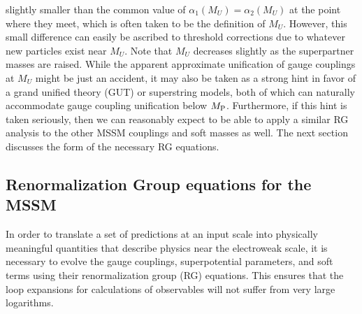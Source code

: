 \documentclass[12pt]{article}
\def\MPlanck{M_{\rm P}}
\begin{document}
slightly smaller than the common value of $\alpha_1(M_U) = \alpha_2(M_U)$
at the point where they meet, which is often taken to be the definition 
of $M_U$. However, this small difference can easily be ascribed to 
threshold corrections due to whatever new particles exist near $M_U$.
Note that $M_U$ decreases slightly as the superpartner masses are 
raised. While 
the apparent approximate unification of gauge couplings at $M_U$ might be 
just an 
accident, it may also be taken as a strong hint in favor of a grand 
unified theory (GUT) or superstring models, both of which can naturally 
accommodate gauge coupling unification below $\MPlanck$. Furthermore, if 
this hint is taken seriously, then we can reasonably expect to be able to 
apply a similar RG analysis to the other MSSM couplings and soft masses as 
well. The next section discusses the form of the necessary RG equations.

\subsection{Renormalization Group equations for the MSSM\label{subsec:RGEs}}
\setcounter{footnote}{1}
\setcounter{equation}{0}

In order to translate a set of predictions at an input scale into 
physically meaningful quantities that describe physics near the 
electroweak scale, it is necessary to evolve the gauge couplings, 
superpotential parameters, and soft terms using their renormalization 
group (RG) equations. This ensures that the loop expansions for 
calculations of observables will not suffer from very large logarithms.
\end{document}

